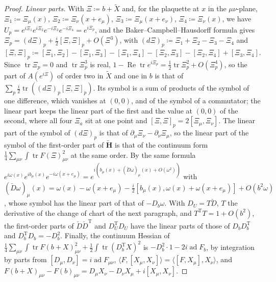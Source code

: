 \documentclass[11pt]{preprint}
\newcommand{\tr}{\operatorname{tr}}
\numberwithin{equation}{section}
\theoremstyle{definition}
\theoremstyle{remark}
\theoremstyle{plain}
\begin{document}
\begin{proof}
\emph{Linear parts.} With $\Xi \coloneqq b + \tilde X$ and, for the plaquette at $x$ in the $\mu\nu$-plane, $\Xi_1 \coloneqq \Xi_\mu(x)$, $\Xi_2 \coloneqq \Xi_\nu(x + e_\mu)$, $\Xi_3 \coloneqq \Xi_\mu(x + e_\nu)$, $\Xi_4 \coloneqq \Xi_\nu(x)$, we have $U_p = e^{i\Xi_1}e^{i\Xi_2}e^{-i\Xi_3}e^{-i\Xi_4} = e^{i\Xi_p}$, and the Baker--Campbell--Hausdorff formula gives $\Xi_p = (d\Xi)_p + \frac i2[\Xi, \Xi]_p + O(\Xi^3)$, with $(d\Xi)_p \coloneqq \Xi_1 + \Xi_2 - \Xi_3 - \Xi_4$ and $[\Xi, \Xi]_p \coloneqq [\Xi_1, \Xi_2] - [\Xi_1, \Xi_3] - [\Xi_1, \Xi_4] - [\Xi_2, \Xi_3] - [\Xi_2, \Xi_4] + [\Xi_3, \Xi_4]$. Since $\tr\Xi_p = 0$ and $\tr\Xi_p^3$ is real, $1 - \operatorname{Re}\tr e^{i\Xi_p} = \frac12\tr\Xi_p^2 + O(\Xi_p^4)$, so the part of $A(e^{i\Xi})$ of order two in $\tilde X$ and one in $b$ is that of $\sum_p\frac i2\tr((d\Xi)_p[\Xi, \Xi]_p)$. Its symbol is a sum of products of the symbol of one difference, which vanishes at $(0, 0)$, and of the symbol of a commutator; the linear part keeps the linear part of the first and the value at $(0, 0)$ of the second, where all four $\Xi_a$ sit at one point and $[\Xi, \Xi]_p = 2[\Xi_\mu, \Xi_\nu]$. The linear part of the symbol of $(d\Xi)_p$ is that of $\partial_\mu\Xi_\nu - \partial_\nu\Xi_\mu$, so the linear part of the symbol of the first-order part of $\tilde{\mathbf H}$ is that of the continuum form $\frac14\sum_{\mu\nu}\int\tr F(\Xi)_{\mu\nu}^2$ at the same order. By the same formula $e^{i\omega(x)}e^{ib_\mu(x)}e^{-i\omega(x+e_\mu)} = e^{i(b_\mu(x) + (\check D\omega)_\mu(x) + O(\omega^2))}$ with $(\check D\omega)_\mu(x) = \omega(x) - \omega(x + e_\mu) - \frac i2[b_\mu(x), \omega(x) + \omega(x + e_\mu)] + O(b^2\omega)$, whose symbol has the linear part of that of $-D_b\omega$. With $D_U = T\check D$, $T$ the derivative of the change of chart of the next paragraph, and $T^{\mathrm T}T = 1 + O(b^2)$, the first-order parts of $\check D\check D^{\mathrm T}$ and $D_U^{\mathrm T}D_U$ have the linear parts of those of $D_bD_b^{\mathrm T}$ and $D_b^{\mathrm T}D_b = -D_b^2$. Finally, the continuum Hessian of $\frac14\sum_{\mu\nu}\int\tr F(b + X)_{\mu\nu}^2 + \frac12\int\tr(D_b^{\mathrm T}X)^2$ is $-D_b^2\cdot 1 - 2i\operatorname{ad}F_b$, by integration by parts from $[D_\mu, D_\nu] = i\operatorname{ad}F_{\mu\nu}$, $\langle F, [X_\mu, X_\nu] \rangle = \langle[F, X_\mu], X_\nu\rangle$, and $F(b + X)_{\mu\nu} - F(b)_{\mu\nu} = D_\mu X_\nu - D_\nu X_\mu + i[X_\mu, X_\nu]$.
\end{proof}
\end{document}
